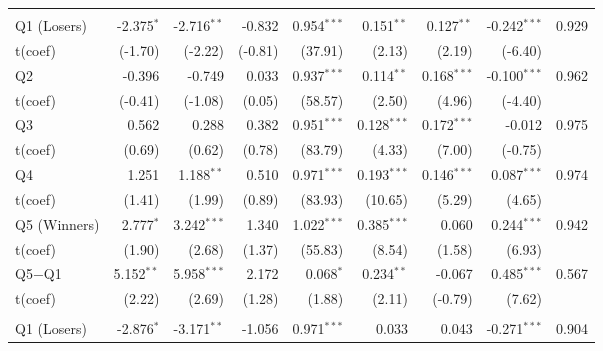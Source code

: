 {\begin{longtable}[t]{lrrrrrrrr}
\endfoot
\bottomrule
\endlastfoot
\addlinespace[0.3em]
\multicolumn{9}{l}{Active --- EW}\\
\hspace{1em}Q1 (Losers) & -2.375$^{*}$ & -2.716$^{**}$ & -0.832 & 0.954$^{***}$ & 0.151$^{**}$ & 0.127$^{**}$ & -0.242$^{***}$ & 0.929\\
\hspace{1em}t(coef) & (-1.70) & (-2.22) & (-0.81) & (37.91) & (2.13) & (2.19) & (-6.40) & \\
\hspace{1em}Q2 & -0.396 & -0.749 & 0.033 & 0.937$^{***}$ & 0.114$^{**}$ & 0.168$^{***}$ & -0.100$^{***}$ & 0.962\\
\hspace{1em}t(coef) & (-0.41) & (-1.08) & (0.05) & (58.57) & (2.50) & (4.96) & (-4.40) & \\
\hspace{1em}Q3 & 0.562 & 0.288 & 0.382 & 0.951$^{***}$ & 0.128$^{***}$ & 0.172$^{***}$ & -0.012 & 0.975\\
\hspace{1em}t(coef) & (0.69) & (0.62) & (0.78) & (83.79) & (4.33) & (7.00) & (-0.75) & \\
\hspace{1em}Q4 & 1.251 & 1.188$^{**}$ & 0.510 & 0.971$^{***}$ & 0.193$^{***}$ & 0.146$^{***}$ & 0.087$^{***}$ & 0.974\\
\hspace{1em}t(coef) & (1.41) & (1.99) & (0.89) & (83.93) & (10.65) & (5.29) & (4.65) & \\
\hspace{1em}Q5 (Winners) & 2.777$^{*}$ & 3.242$^{***}$ & 1.340 & 1.022$^{***}$ & 0.385$^{***}$ & 0.060 & 0.244$^{***}$ & 0.942\\
\hspace{1em}t(coef) & (1.90) & (2.68) & (1.37) & (55.83) & (8.54) & (1.58) & (6.93) & \\
\hspace{1em}Q5$-$Q1 & 5.152$^{**}$ & 5.958$^{***}$ & 2.172 & 0.068$^{*}$ & 0.234$^{**}$ & -0.067 & 0.485$^{***}$ & 0.567\\
\hspace{1em}t(coef) & (2.22) & (2.69) & (1.28) & (1.88) & (2.11) & (-0.79) & (7.62) & \\
\addlinespace[0.3em]
\hline
\multicolumn{9}{l}{Active --- VW}\\
\hspace{1em}Q1 (Losers) & -2.876$^{*}$ & -3.171$^{**}$ & -1.056 & 0.971$^{***}$ & 0.033 & 0.043 & -0.271$^{***}$ & 0.904\\

\end{longtable}}
